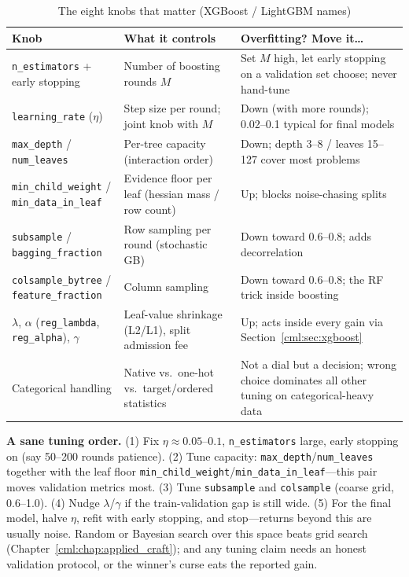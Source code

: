 \begin{table}[H]
\centering
\small
\caption{The eight knobs that matter (XGBoost / LightGBM names)}
\label{cml:tab:gbdt_knobs}
\begin{tabularx}{\textwidth}{lXX}
\toprule
\textbf{Knob} & \textbf{What it controls} & \textbf{Overfitting? Move it\ldots} \\
\midrule
\texttt{n\_estimators} + early stopping & Number of boosting rounds $M$ & Set $M$ high, let early stopping on a validation set choose; never hand-tune \\
\texttt{learning\_rate} ($\eta$) & Step size per round; joint knob with $M$ & Down (with more rounds); 0.02--0.1 typical for final models \\
\texttt{max\_depth} / \texttt{num\_leaves} & Per-tree capacity (interaction order) & Down; depth 3--8 / leaves 15--127 cover most problems \\
\texttt{min\_child\_weight} / \texttt{min\_data\_in\_leaf} & Evidence floor per leaf (hessian mass / row count) & Up; blocks noise-chasing splits \\
\texttt{subsample} / \texttt{bagging\_fraction} & Row sampling per round (stochastic GB) & Down toward 0.6--0.8; adds decorrelation \\
\texttt{colsample\_bytree} / \texttt{feature\_fraction} & Column sampling & Down toward 0.6--0.8; the RF trick inside boosting \\
$\lambda$, $\alpha$ (\texttt{reg\_lambda}, \texttt{reg\_alpha}), $\gamma$ & Leaf-value shrinkage (L2/L1), split admission fee & Up; acts inside every gain via Section~\ref{cml:sec:xgboost} \\
Categorical handling & Native vs.\ one-hot vs.\ target/ordered statistics & Not a dial but a decision; wrong choice dominates all other tuning on categorical-heavy data \\
\bottomrule
\end{tabularx}
\end{table}

\textbf{A sane tuning order.} (1) Fix $\eta \approx 0.05$--$0.1$, \texttt{n\_estimators} large, early stopping on (say 50--200 rounds patience). (2) Tune capacity: \texttt{max\_depth}/\texttt{num\_leaves} together with the leaf floor \texttt{min\_child\_weight}/\texttt{min\_data\_in\_leaf}---this pair moves validation metrics most. (3) Tune \texttt{subsample} and \texttt{colsample} (coarse grid, 0.6--1.0). (4) Nudge $\lambda$/$\gamma$ if the train-validation gap is still wide. (5) For the final model, halve $\eta$, refit with early stopping, and stop---returns beyond this are usually noise. Random or Bayesian search over this space beats grid search (Chapter~\ref{cml:chap:applied_craft}); and any tuning claim needs an honest validation protocol, or the winner's curse eats the reported gain.

